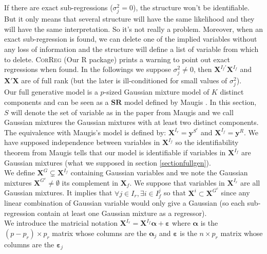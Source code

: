 \documentclass[12pt,a4paper]{report}
\begin{document}
		If there are exact sub-regressions ($\sigma^2_j=0$), the structure won't be identifiable. But it only means that several structure will have the same likelihood and they will have the same interpretation. So it's not really a problem. Moreover, when an exact sub-regression is found, we can delete one of the implied variables without any loss of information and the structure will define a list of variable from which to delete. \textsc{CorReg} (Our R package) prints a warning to point out exact regressions when found.
	In the followings we suppose $\sigma^2_j\neq 0$, then $\boldsymbol{X}^{I_f'}\boldsymbol{X}^{I_f}$ and $\boldsymbol{X}'\boldsymbol{X}$ are of full rank (but the later is ill-conditioned for small values of $\sigma^2_j$).
	\\
	
Our full generative model is a $p$-sized Gaussian mixture model of $K$ distinct components and 
%	
	can be seen as a $\mathbf{SR}$ model defined by Maugis \cite{maugis2009variable}. In this section, $S$ will denote the set of variable as in the paper from Maugis and we call Gaussian mixtures the Gaussian mixtures with at least two distinct components. The equivalence with Maugis's model is defined by:
	$\boldsymbol{X}^{I_r}=\boldsymbol{y}^{S^c}$ and $\boldsymbol{X}^{I_f}=\boldsymbol{y}^R$. We have supposed independence between variables in $\boldsymbol{X}^{I_f}$ so the identifiability theorem from Maugis tells that our model is identifiable if variables in $\boldsymbol{X}^{I_f}$ are Gaussian mixtures (what we supposed in section \ref{sectionfullgen}).
	\\
	
	
We define $\boldsymbol{X}^G \subsetneq \boldsymbol{X}^{I_f}$ containing Gaussian variables and we note the Gaussian mixtures $\boldsymbol{X}^{G^c}\neq \emptyset$ its complement in $\boldsymbol{X}_f$.
We suppose that variables in $\boldsymbol{X}^{I_r}$ are all Gaussian mixtures. It implies that $\forall j  \in I_r,\exists i \in I_f^j $ so that $\boldsymbol{X}^i \subset \boldsymbol{X}^{G^c} $ since any linear combination of Gaussian variable would only give a Gaussian (so each sub-regression contain at least one Gaussian mixture as a regressor).
\\
	We introduce the matricial notation
		$\boldsymbol{X}^{I_r}=\boldsymbol{X}^{I_f}\boldsymbol{\alpha} + \boldsymbol{\varepsilon}$ where
		 $\boldsymbol{\alpha}$ is the $(p-p_r)\times p_r$ matrix whose columns are the $\boldsymbol{\alpha}_j$ and $\boldsymbol{\varepsilon}$ is the $n\times p_r$ matrix whose columns are the $\boldsymbol{\varepsilon}_j$
		
\end{document}
